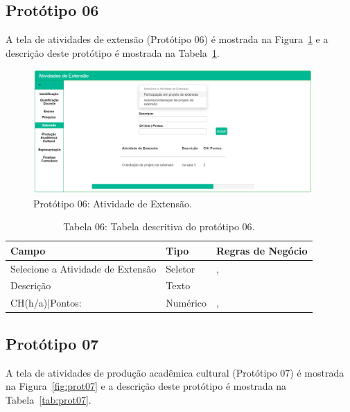 \newpage
\subsection{Protótipo 06}\label{prototipo06}
A tela de atividades de extensão (Protótipo 06) é mostrada na Figura~\ref{fig:prot06} e a descrição deste protótipo é mostrada na Tabela~\ref{tab:prot06}.


\begin{figure}[H]
    \centering
    \includegraphics[width=0.95\textwidth]{img/6pagina_extensao.png}
    \caption[Protótipo 06: Atividade de Extensão]{Protótipo 06: Atividade de Extensão.}
    \label{fig:prot06}
\end{figure}


\begin{table}[H]
\centering
\caption[Tabela 06: Tabela descritiva do protótipo 06.]{Tabela 06: Tabela descritiva do protótipo 06.}
\label{tab:prot06}
\begin{tabular}{@{}lll@{}}
\toprule
Campo                             & Tipo     &  Regras de Negócio     \\ \midrule
Selecione a Atividade de Extensão & Seletor  &    \nameref{rn009}, \nameref{rn019}\\
Descrição                         & Texto    &    \nameref{rn009}                 \\
CH(h/a)|Pontos:                   & Numérico &    \nameref{rn009}, \nameref{rn020}\\ \bottomrule
\end{tabular}
\end{table}

\newpage
\subsection{Protótipo 07}\label{prototipo07}
A tela de atividades de produção acadêmica cultural (Protótipo 07) é mostrada na Figura~\ref{fig:prot07} e a descrição deste protótipo é mostrada na Tabela~\ref{tab:prot07}.


